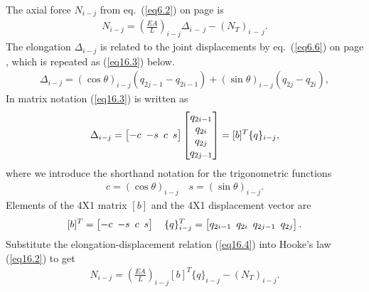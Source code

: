 \documentclass{AeroStructure-ERJohnson}
\begin{document}
\noindent The axial force $N_{i-j}$ from eq.~(\ref{eq6.2}) on page \pageref{eq6.2} is
\begin{align}\label{eq16.2}
N_{i-j}=\left(\frac{E A}{L}\right)_{i-j} \Delta_{i\,{-}\,j}-\left(N_{T}\right)_{i\,{-}\,j}.
\end{align}
The elongation $\Delta_{i-j}$ is related to the joint displacements by eq.~(\ref{eq6.6}) on page \pageref{eq6.6}, which is repeated as (\ref{eq16.3}) below.
\begin{align}\label{eq16.3}
\Delta_{i-j}=(\cos \theta)_{i-j}(q_{2 j-1}-q_{2 i-1})+(\sin \theta)_{i-j}(q_{2 j}-q_{2 i}),
\end{align}
In matrix notation (\ref{eq16.3}) is written as
\begin{align}\label{eq16.4}
\Delta_{i-j}=\left[\begin{array}{@{}llll@{}}-c \!\!\!& -s\!\!\! & c\!\!\! & s\end{array}\right]\left[\begin{array}{@{}c@{}}q_{2 i-1} \\q_{2 i} \\q_{2 j} \\q_{2 j-1}\end{array}\right]=[b]^{T}\{q\}_{i-j},
\end{align}
where we introduce the shorthand notation for the trigonometric functions
\begin{align}\label{eq16.5}
c=(\cos \theta)_{i-j} \quad s=(\sin \theta)_{i-j}.
\end{align}
Elements of the 4X1 matrix $[b]$ and the 4X1 displacement vector are
\begin{align}\label{eq16.6}
[b]^{T}=\left[\begin{array}{@{}llll@{}} -c\!\!\! & -s\!\!\! & c\!\!\! & s \end{array}\right] \quad \{q\}_{i-j}^{T}=\left[\begin{array}{@{}llll@{}} q_{2 i-1}\!\!\! & q_{2 i}\!\!\! & q_{2 j-1}\!\!\! & q_{2 j} \end{array}\right].
\end{align}
Substitute the elongation-displacement relation (\ref{eq16.4}) into Hooke's law (\ref{eq16.2}) to get
\begin{align}\label{eq16.7}
N_{i-j}=\left(\frac{E A}{L}\right)_{i-j}[b]^{T}\{q\}_{i-j}-\left(N_{T}\right)_{i-j}.
\end{align}

\vspace*{-1pc}
\end{document}
